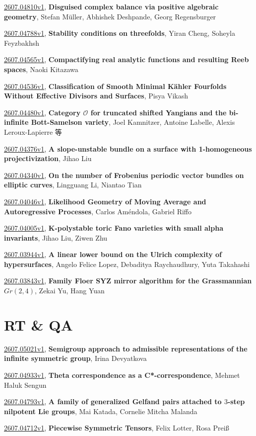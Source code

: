 \documentclass[9pt, a4paper]{article}
\theoremstyle{plain}
\theoremstyle{definition}
\theoremstyle{remark}
\newcommand{\arxiv}[3]{\href{https://arxiv.org/abs/#1}{#1}, \textbf{\textcolor{arxivblue}{#2}}, #3}
\begin{document}
\arxiv{2607.04810v1}{Disguised complex balance via positive algebraic geometry}{Stefan Müller, Abhishek Deshpande, Georg Regensburger}

\arxiv{2607.04788v1}{Stability conditions on threefolds}{Yiran Cheng, Soheyla Feyzbakhsh}

\arxiv{2607.04565v1}{Compactifying real analytic functions and resulting Reeb spaces}{Naoki Kitazawa}

\arxiv{2607.04536v1}{Classification of Smooth Minimal Kähler Fourfolds Without Effective Divisors and Surfaces}{Pisya Vikash}

\arxiv{2607.04480v1}{Category $\mathcal{O}$ for truncated shifted Yangians and the bi-infinite Bott-Samelson variety}{Joel Kamnitzer, Antoine Labelle, Alexis Leroux-Lapierre 等}

\arxiv{2607.04376v1}{A slope-unstable bundle on a surface with 1-homogeneous projectivization}{Jihao Liu}

\arxiv{2607.04340v1}{On the number of Frobenius periodic vector bundles on elliptic curves}{Lingguang Li, Niantao Tian}

\arxiv{2607.04046v1}{Likelihood Geometry of Moving Average and Autoregressive Processes}{Carlos Améndola, Gabriel Riffo}

\arxiv{2607.04005v1}{K-polystable toric Fano varieties with small alpha invariants}{Jihao Liu, Ziwen Zhu}

\arxiv{2607.03944v1}{A linear lower bound on the Ulrich complexity of hypersurfaces}{Angelo Felice Lopez, Debaditya Raychaudhury, Yuta Takahashi}

\arxiv{2607.03843v1}{Family Floer SYZ mirror algorithm for the Grassmannian $Gr(2,4)$}{Zekai Yu, Hang Yuan}


\section{RT \& QA}
\arxiv{2607.05021v1}{Semigroup approach to admissible representations of the infinite symmetric group}{Irina Devyatkova}

\arxiv{2607.04933v1}{Theta correspondence as a C*-correspondence}{Mehmet Haluk Sengun}

\arxiv{2607.04793v1}{A family of generalized Gelfand pairs attached to $3$-step nilpotent Lie groups}{Mai Katada, Cornelie Mitcha Malanda}

\arxiv{2607.04712v1}{Piecewise Symmetric Tensors}{Felix Lotter, Rosa Preiß}
\end{document}
